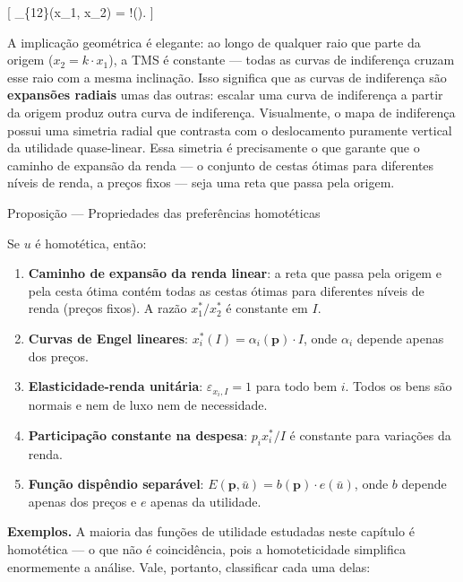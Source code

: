 \documentclass[11pt,twoside,openright]{book}
\providecommand{\tightlist}{\setlength{\itemsep}{0pt}\setlength{\parskip}{0pt}}
\begin{document}
{[} \_\{12\}(x\_1, x\_2) = \phi!\left(\right).
\label{eq:3.6.15}  {]}

A implicação geométrica é elegante: ao longo de qualquer raio que parte
da origem (\(x_2 = k \cdot x_1\)), a TMS é constante --- todas as curvas
de indiferença cruzam esse raio com a mesma inclinação. Isso significa
que as curvas de indiferença são \textbf{expansões radiais} umas das
outras: escalar uma curva de indiferença a partir da origem produz outra
curva de indiferença. Visualmente, o mapa de indiferença possui uma
simetria radial que contrasta com o deslocamento puramente vertical da
utilidade quase-linear. Essa simetria é precisamente o que garante que o
caminho de expansão da renda --- o conjunto de cestas ótimas para
diferentes níveis de renda, a preços fixos --- seja uma reta que passa
pela origem.

\begin{theorembox}{Proposição — Propriedades das preferências homotéticas}

Se \(u\) é homotética, então:

\begin{enumerate}
\def\labelenumi{\arabic{enumi}.}
\tightlist
\item
  \textbf{Caminho de expansão da renda linear}: a reta que passa pela
  origem e pela cesta ótima contém todas as cestas ótimas para
  diferentes níveis de renda (preços fixos). A razão \(x_1^*/x_2^*\) é
  constante em \(I\).
\item
  \textbf{Curvas de Engel lineares}:
  \(x_i^*(I) = \alpha_i(\mathbf{p}) \cdot I\), onde \(\alpha_i\) depende
  apenas dos preços.
\item
  \textbf{Elasticidade-renda unitária}: \(\varepsilon_{x_i, I} = 1\)
  para todo bem \(i\). Todos os bens são normais e nem de luxo nem de
  necessidade.
\item
  \textbf{Participação constante na despesa}: \(p_i x_i^* / I\) é
  constante para variações da renda.
\item
  \textbf{Função dispêndio separável}:
  \(E(\mathbf{p}, \bar{u}) = b(\mathbf{p}) \cdot e(\bar{u})\), onde
  \(b\) depende apenas dos preços e \(e\) apenas da utilidade.
\end{enumerate}

\end{theorembox}

\textbf{Exemplos.} A maioria das funções de utilidade estudadas neste
capítulo é homotética --- o que não é coincidência, pois a
homoteticidade simplifica enormemente a análise. Vale, portanto,
classificar cada uma delas:
\end{document}
